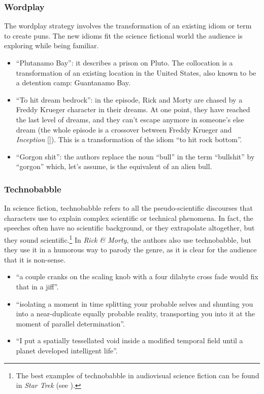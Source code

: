 \documentclass[output=paper]{langscibook}
\begin{document}
\subsubsection{Wordplay}

The wordplay strategy involves the transformation of an existing idiom or term to create puns. The new idioms fit the science fictional world the audience is exploring while being familiar.

\begin{itemize}
\item “Plutanamo Bay”: it describes a prison on Pluto. The collocation is a transformation of an existing location in the United States, also known to be a detention camp: Guantanamo Bay.
\item “To hit dream bedrock”: in the episode, Rick and Morty are chased by a Freddy Krueger character \citep{Craven1984} in their dreams. At one point, they have reached the last level of dreams, and they can’t escape anymore in someone’s else dream (the whole episode is a crossover between Freddy Krueger and \textit{Inception} [\citealt{Nolan2010}]). This is a transformation of the idiom “to hit rock bottom”.
\item “Gorgon shit”: the authors replace the noun “bull” in the term “bullshit” by “gorgon” which, let’s assume, is the equivalent of an alien bull.
\end{itemize}

\subsubsection{Technobabble}

In science fiction, technobabble refers to all the pseudo-scientific discourses that characters use to explain complex scientific or technical phenomena. In fact, the speeches often have no scientific background, or they extrapolate altogether, but they sound scientific.\footnote{The best examples of technobabble in audiovisual science fiction can be found in \textit{Star Trek} (see \citealt{Wozniak2014}).} In \textit{Rick \& Morty}, the authors also use technobabble, but they use it in a humorous way to parody the genre, as it is clear for the audience that it is non-sense.

\begin{itemize}
\item “a couple cranks on the scaling knob with a four dilabyte cross fade would fix that in a jiff”.
\item “isolating a moment in time splitting your probable selves and shunting you into a near-duplicate equally probable reality, transporting you into it at the moment of parallel determination”.
\item “I put a spatially tessellated void inside a modified temporal field until a planet developed intelligent life”.
\end{itemize}
\end{document}
